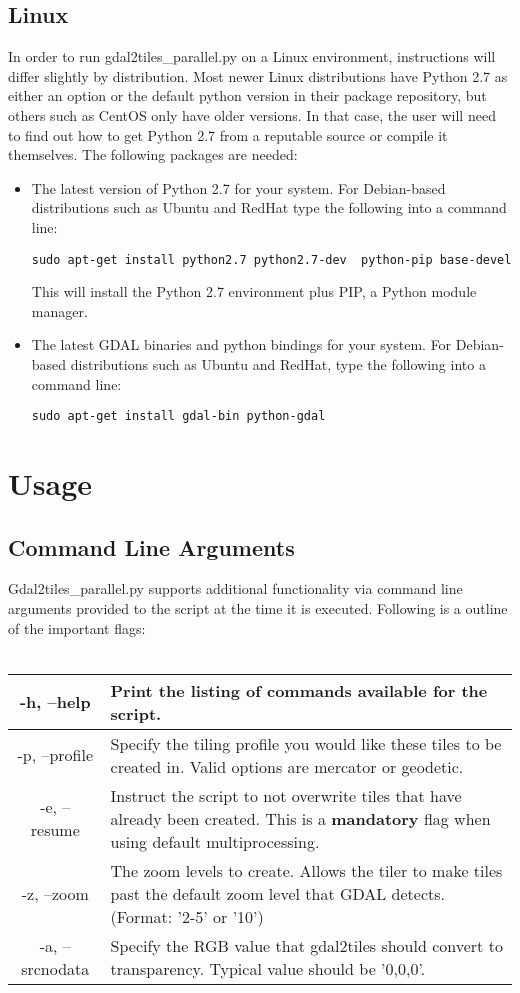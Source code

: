 \documentclass{article}
\begin{document}
\subsection{Linux}
In order to run gdal2tiles\_parallel.py on a Linux environment, instructions
will differ slightly by distribution.  Most newer Linux distributions have
Python 2.7 as either an option or the default python version in their package
repository, but others such as CentOS only have older versions.  In that case,
the user will need to find out how to get Python 2.7 from a reputable source or
compile it themselves.  The following packages are needed:
\begin{itemize}
    \item 
        The latest version of Python 2.7 for your system.  For Debian-based
        distributions such as Ubuntu and RedHat type the following into a
        command line: 

        \lstinline|sudo apt-get install python2.7 python2.7-dev  python-pip base-devel| 

        This will install the Python 2.7 environment plus PIP, a Python
        module manager.
    \item
        The latest GDAL binaries and python bindings for your system.  For
        Debian-based distributions such as Ubuntu and RedHat, type the
        following into a command line:

        \lstinline|sudo apt-get install gdal-bin python-gdal|
\end{itemize}
\section{Usage}
\subsection{Command Line Arguments}
Gdal2tiles\_parallel.py supports additional functionality via command line
arguments provided to the script at the time it is executed.  Following is a
outline of the important flags:
\\\\
\begin{tabular}{ | c | p{14cm} | }
    \hline
    -h, --help & Print the listing of commands available for the script.\\
    \hline
    -p, --profile & Specify the tiling profile you would like these tiles to be
    created in.  Valid options are mercator or geodetic.\\
    \hline
    -e, --resume & Instruct the script to not overwrite tiles that have already
    been created.  This is a {\bf mandatory} flag when using default
    multiprocessing.\\
    \hline
    -z, --zoom & The zoom levels to create.  Allows the tiler to make tiles
    past the default zoom level that GDAL detects.  (Format: '2-5' or '10')
    \\
    \hline
    -a, --srcnodata & Specify the RGB value that gdal2tiles should convert to
    transparency.  Typical value should be '0,0,0'.
    \\
    \hline
\end{tabular}
\end{document}
